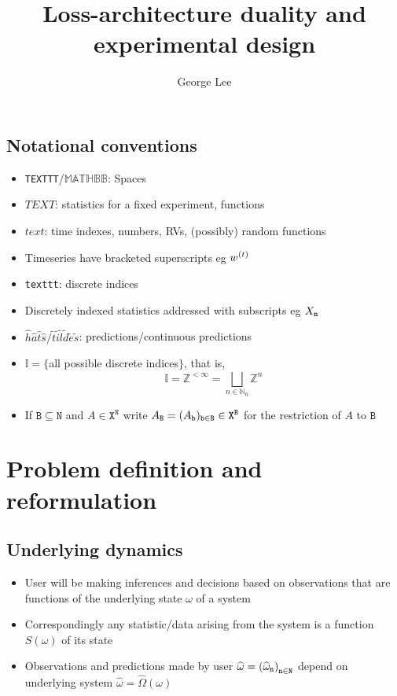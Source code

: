 \documentclass{article}
\title{Loss-architecture duality and experimental design}
\author{George Lee}
\newcommand{\TYPE}[1][X]{{\texttt{#1}}}
\newcommand{\BATCH}{{\texttt{B}}}
\newcommand{\INDICES}{{\mathbb{I}}}
\newcommand{\ROWS}{{\texttt N}}
\newcommand{\Phase}{{\omega}}
\newcommand{\PHASE}{{\Omega}}
\newcommand{\PhaseK}{{\widehat\Phase}}
\newcommand{\PHASEK}{{\widehat\PHASE}}
\newcommand{\STAT}{{S}}
\begin{document}
\maketitle


\subsection{Notational conventions}
\begin{itemize}
  \item
    \texttt{TEXTTT}/$\mathbb{MATHBB}$: Spaces
  \item
    $TEXT$: statistics for a fixed experiment, functions
  \item
    $text$: time indexes, numbers, RVs, (possibly) random functions
  \item
    Timeseries have bracketed superscripts eg $\TS[w]$
  \item
    \texttt{texttt}: discrete indices
  \item
    Discretely indexed statistics addressed with subscripts eg $\IND$
  \item
    $\hat h\hat a\hat t\hat s/\tilde t\tilde i\tilde l\tilde d\tilde e\tilde s$: predictions/continuous predictions
  \item
    $\INDICES=\{$all possible discrete indices$\}$, that is,
    $$
    \INDICES=\mathbb Z^{<\infty}=\bigsqcup_{n\in\mathbb N_0}\mathbb Z^n
    $$
  \item
    If $\BATCH\subseteq\ROWS$ and  $A\in\TYPE^\ROWS$ write $\REST[A]=(\IND[A][b])_{\texttt b\in\BATCH}\in\TYPE^\BATCH$ for the restriction of $A$ to $\BATCH$
\end{itemize}


\section{Problem definition and reformulation}
\subsection{Underlying dynamics}
\begin{itemize}
  \item
    User will be making inferences and decisions based on observations that are functions of the underlying state $\Phase$ of a system
  \item
    Correspondingly any statistic/data arising from the system is a function $\STAT(\Phase)$ of its state
  \item
    Observations and predictions made by user $\PhaseK=\ENUM[\PhaseK]$ depend on underlying system $\PhaseK=\PHASEK(\Phase)$
\end{itemize}
\end{document}
